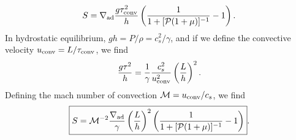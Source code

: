 \documentclass[onecolumn, amsmath, amsfonts, amssymb]{aastex62}
\newcommand{\grad}{\ensuremath{\nabla}}
\begin{document}
\begin{enumerate}
        \begin{equation}
            S = \grad_{\rm{ad}}\frac{g \tau_{\rm{conv}}^2}{h}\left(\frac{1}{1 + [\mathcal{P}(1 + \mu)]^{-1}} - 1\right).
        \end{equation}
        In hydrostatic equilibrium, $g h = P/\rho = c_s^2 / \gamma$, and if we define the convective velocity $u_{\rm{conv}} = L/\tau_{\rm{conv}}$, we find
        \begin{equation}
            \frac{g \tau^2}{h} = \frac{1}{\gamma}\frac{c_s^2}{u_{\rm{conv}}^2}\left(\frac{L}{h}\right)^2.
        \end{equation}
        Defining the mach number of convection $\mathcal{M} = u_{\rm{conv}}/c_s$, we find
        \begin{equation}
            \boxed{
                S = \mathcal{M}^{-2}\frac{\grad_{\rm{ad}}}{\gamma}\left(\frac{L}{h}\right)^2\left(\frac{1}{1 + [\mathcal{P}(1 + \mu)]^{-1}} - 1\right)}.
        \end{equation}
\end{enumerate}
\end{document}
